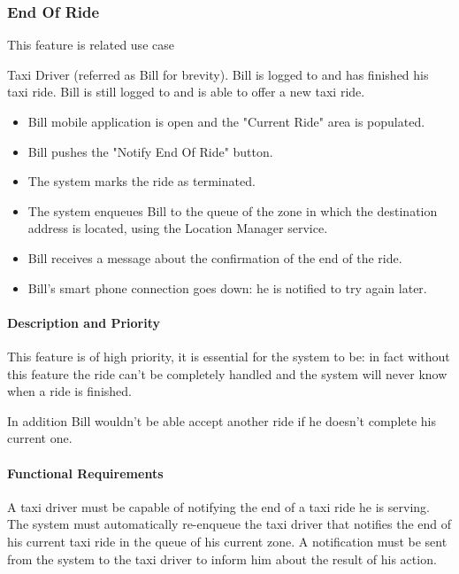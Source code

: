 \subsubsection{End Of Ride}
This feature is related  use case
\begin{itemize}
	 Taxi Driver (referred as Bill for brevity).
	 Bill is logged to \myTaxiService{} and has finished his taxi ride.
	 Bill is still logged to \myTaxiService{} and is able to offer a new taxi ride.
	\begin{itemize}
		\item Bill \myTaxiService{} mobile application is open and the "Current Ride" area is populated.
		\item Bill pushes the "Notify End Of Ride" button.
		\item The system marks the ride as terminated.
		\item The system enqueues Bill to the queue of the zone in which the destination address is located, using the Location Manager service.
		\item Bill receives a message about the confirmation of the end of the ride. 
	\end{itemize}
	\begin{itemize}
		\item Bill's smart phone connection goes down: he is notified to try again later.
	\end{itemize}
\end{itemize}
\paragraph{Description and Priority}
This feature is of high priority, it is essential for the system to be: in fact without this feature the ride can't be completely handled and the system will never know when a ride is finished.\par In addition Bill wouldn't be able accept another ride if he doesn't complete his current one.
\paragraph{Functional Requirements}
\begin{itemize}
	 A taxi driver must be capable of notifying the end of a taxi ride he is serving.
	 The system must automatically re-enqueue the taxi driver that notifies the end of his current taxi ride in the queue of his current zone.
	 A notification must be sent from the system to the taxi driver to inform him about the result of his action.
\end{itemize}

